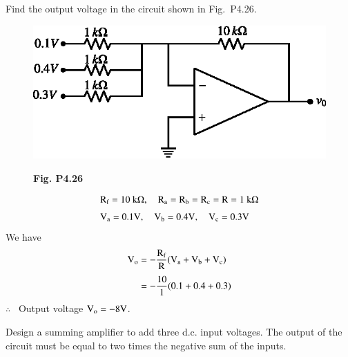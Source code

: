 \begin{problem}\label{prob4.26}
Find the output voltage in the circuit shown in Fig.~P4.26.
\begin{figure}[H]
\centering
\includegraphics{chap4/figP4.25.eps}

\smallskip
{\bf Fig. P4.26}
\end{figure}
\end{problem}

\begin{solution}
\begin{align*}
&\textrm{R}_{\textrm{f}}=10\text{~k}\Omega,\quad \textrm{R}_{\textrm{a}}=\textrm{R}_{\textrm{b}}=\textrm{R}_{\textrm{c}}=\textrm{R}=1~\textrm{k}\Omega\\[3pt]
&\textrm{V}_{\textrm{a}}=0.1\textrm{V},\quad \textrm{V}_{\textrm{b}}=0.4\textrm{V},\quad \textrm{V}_{\textrm{c}}=0.3\textrm{V}
\end{align*}
We have
\begin{align*}
\textrm{V}_{\textrm{o}} &= -\frac{\textrm{R}_{\textrm{f}}}{\textrm{R}}(\textrm{V}_{\textrm{a}}+\textrm{V}_{\textrm{b}}+\textrm{V}_{\textrm{c}})\\[3pt]
&= -\frac{10}{1}(0.1+0.4+0.3)
\end{align*}
$\therefore$~ Output voltage $\textrm{V}_{\textrm{o}}=-8\textrm{V}$.
\end{solution}

\begin{problem}\label{prob4.27}
Design a summing amplifier to add three d.c. input voltages. The output of the circuit must be equal to two times the negative sum of the inputs.
\end{problem}


